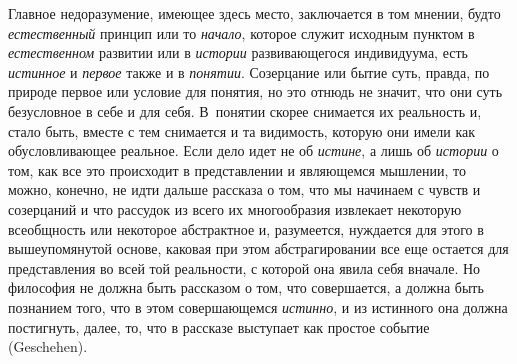 {Главное недоразумение, имеющее здесь место, заключается в том
мнении, будто {\em естественный}
принцип или то
{\em начало}, которое
служит исходным пунктом в
{\em естественном}
развитии или в
{\em истории}
развивающегося индивидуума, есть
{\em истинное} и
{\em первое} также и в
{\em понятии}. Созерцание
или бытие суть, правда, по природе первое или условие для понятия, но это
отнюдь не значит, что они суть безусловное в себе и для себя. В~понятии
скорее снимается их реальность и, стало быть, вместе с тем снимается и та
видимость, которую они имели как обусловливающее реальное. Если дело идет
не об {\em истине}, а
лишь об {\em истории} о
том, как все это происходит в представлении и являющемся мышлении, то
можно, конечно, не идти дальше рассказа о том, что мы начинаем с чувств и
созерцаний и что рассудок из всего их многообразия извлекает некоторую
всеобщность или некоторое абстрактное и, разумеется, нуждается для этого в
вышеупомянутой основе, каковая при этом абстрагировании все еще остается
для представления во всей той реальности, с которой она явила себя вначале.
Но философия не должна быть рассказом о том, что совершается, а должна быть
познанием того, что в этом совершающемся
{\em истинно}, и из
истинного она должна постигнуть, далее, то, что в рассказе выступает как
простое событие (Geschehen).

}
